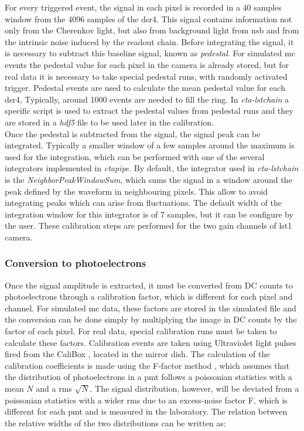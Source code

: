\documentclass[main.tex]{subfiles}
\begin{document}
For every triggered event, the signal in each pixel is recorded in a 40 samples window from the 4096 samples of the \gls{dsr4}. This signal contains information not only from the Cherenkov light, but also from background light from \gls{nsb} and from the intrinsic noise induced by the readout chain. Before integrating the signal, it is necessary to subtract this baseline signal, known as \textit{pedestal}. For simulated \gls{mc} events the pedestal value for each pixel in the camera is already stored, but for real data it is necessary to take special pedestal runs, with randomly activated trigger. Pedestal events are used to calculate the mean pedestal value for each \gls{dsr4}, Typically, around 1000 events are needed to fill the ring. In \textit{cta-lstchain} a specific script is used to extract the pedestal values from pedestal runs and they are stored in a \textit{hdf5} file to be used later in the calibration.\\
Once the pedestal is subtracted from the signal, the signal peak can be integrated. Typically a smaller window of a few samples around the maximum is used for the integration, which can be performed with one of the several integrators implemented in \textit{ctapipe}. By default, the integrator used in \textit{cta-lstchain} is the \textit{NeighborPeakWindowSum}, which sums the signal in a window around the peak defined by the waveform in neighbouring pixels. This allow to avoid integrating peaks which can arise from fluctuations. The default width of the integration window for this integrator is of 7 samples, but it can be configure by the user. These calibration steps are performed for the two gain channels of \gls{lst}1 camera. 

\subsubsection{Conversion to photoelectrons}

Once the signal amplitude is extracted, it must be converted from DC counts to photoelectrons through a calibration factor, which is different for each pixel and channel. For simulated \gls{mc} data, these factors are stored in the simulated file and the conversion can be done simply by multiplying the image in DC counts by the factor of each pixel. For real data, special calibration runs must be taken to calculate these factors. Calibration events are taken using Ultraviolet light pulses fired from the CaliBox \cite{2015CaliBox}, \cite{2019CaliBox} located in the mirror dish. The calculation of the calibration coefficients is made using the F-factor method \cite{1997calibrationPMT}, which assumes that the distribution of photoelectrons in a \gls{pmt} follows a poissonian statistics with a mean $N$ and a \gls{rms} $\sqrt{N}$. The signal distribution, however, will be deviated from a poissonian statistics with a wider \gls{rms} due to an excess-noise factor F, which is different for each \gls{pmt} and is measured in the laboratory. The relation between the relative widths of the two distributions can be written as:
\end{document}
